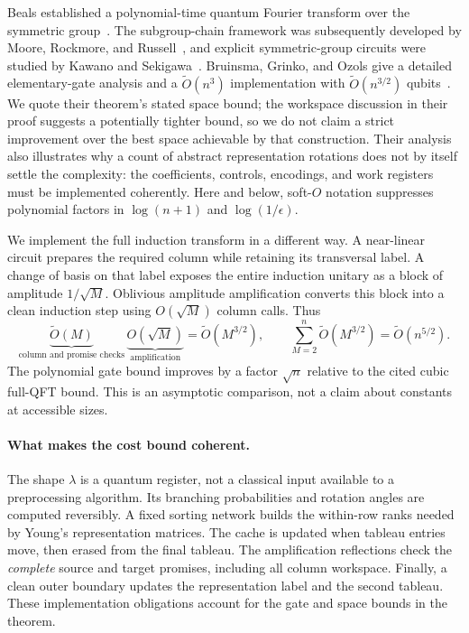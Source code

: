 \documentclass[11pt]{article}
\theoremstyle{definition}
\newcommand{\softO}{\widetilde O}
\begin{document}
Beals established a polynomial-time quantum Fourier transform over the
symmetric group~\cite{beals}. The subgroup-chain framework was subsequently
developed by Moore, Rockmore, and Russell~\cite{mrr}, and explicit
symmetric-group circuits were studied by Kawano and
Sekigawa~\cite{ks13,ks16}. Bruinsma, Grinko, and Ozols give a detailed
elementary-gate analysis and a $\softO(n^3)$ implementation with
$\softO(n^{3/2})$ qubits~\cite[Theorem 1.1]{bgo}.
We quote their theorem's stated space bound; the workspace discussion in
their proof suggests a potentially tighter bound, so we do not claim a
strict improvement over the best space achievable by that construction.
Their analysis also illustrates why a count of abstract representation
rotations does not by itself settle the complexity: the coefficients,
controls, encodings, and work registers must be implemented coherently.
Here and below, soft-$O$ notation suppresses polynomial factors in
$\log(n+1)$ and $\log(1/\epsilon)$.

We implement the full induction transform in a different way.
A near-linear circuit prepares the required column while retaining its
transversal label. A change of basis on that label exposes the entire
induction unitary as a block of amplitude $1/\sqrt M$.
Oblivious amplitude amplification converts this block into a clean
induction step using $O(\sqrt M)$ column calls.
Thus
\begin{equation}\label{eq:intro-cost}
 \underbrace{\softO(M)}_{\text{column and promise checks}}\,
 \underbrace{O(\sqrt M)}_{\text{amplification}}
 =\softO(M^{3/2}),
 \qquad
 \sum_{M=2}^{n}\softO(M^{3/2})=\softO(n^{5/2}).
\end{equation}
The polynomial gate bound improves by a factor $\sqrt n$ relative
to the cited cubic full-QFT bound. This is an asymptotic comparison, not
a claim about constants at accessible sizes.

\paragraph{What makes the cost bound coherent.}
The shape $\lambda$ is a quantum register, not a classical input available
to a preprocessing algorithm. Its branching probabilities and rotation
angles are computed reversibly. A fixed sorting network builds the
within-row ranks needed by Young's representation matrices. The cache is
updated when tableau entries move, then erased from the final tableau.
The amplification reflections check the \emph{complete} source and target
promises, including all column workspace. Finally, a clean outer boundary
updates the representation label and the second tableau.
These implementation obligations account for the gate and space bounds
in the theorem.
\end{document}
